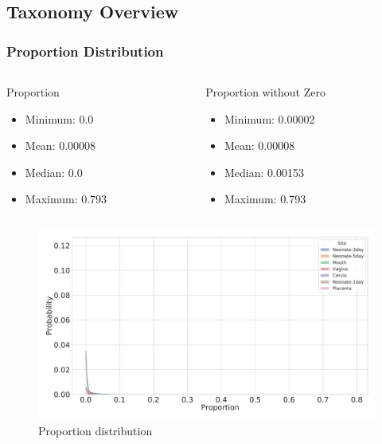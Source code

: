 \documentclass{beamer}
\begin{document}
    \subsection{Taxonomy Overview}
    \begin{frame}
        \frametitle{Proportion Distribution}

        \begin{columns}
            \begin{column}{0.4 \linewidth}
                \begin{block}{Proportion}
                    \begin{itemize}
                        \item Minimum: 0.0
                        \item Mean: 0.00008
                        \item Median: 0.0
                        \item Maximum: 0.793
                    \end{itemize}
                \end{block}
            \end{column}

            \begin{column}{0.4 \linewidth}
                \begin{block}{Proportion without Zero}
                    \begin{itemize}
                        \item Minimum: 0.00002
                        \item Mean: 0.00008
                        \item Median: 0.00153
                        \item Maximum: 0.793
                    \end{itemize}
                \end{block}
            \end{column}
        \end{columns}

        \begin{figure}
            \includegraphics[width=0.5 \linewidth]{figures/Step53_Proportion/everything.DADA2.homd.uncorrected.pdf}
            \caption{Proportion distribution}
        \end{figure}
    \end{frame}
\end{document}
